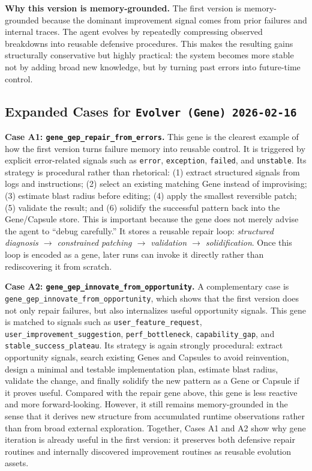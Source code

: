 \documentclass{article}
\newcommand{\nbf}[1]{{\noindent \textbf{#1}}}
\begin{document}
\nbf{Why this version is memory-grounded.}
The first version is memory-grounded because the dominant improvement signal comes from prior failures and internal traces.
The agent evolves by repeatedly compressing observed breakdowns into reusable defensive procedures.
This makes the resulting gains structurally conservative but highly practical: the system becomes more stable not by adding broad new knowledge, but by turning past errors into future-time control.

\subsection{Expanded Cases for \texttt{Evolver (Gene) 2026-02-16}}
\label{app:first_run_cases}

\nbf{Case A1: \texttt{gene\_gep\_repair\_from\_errors}.}
This gene is the clearest example of how the first version turns failure memory into reusable control.
It is triggered by explicit error-related signals such as \texttt{error}, \texttt{exception}, \texttt{failed}, and \texttt{unstable}.
Its strategy is procedural rather than rhetorical:
(1) extract structured signals from logs and instructions;
(2) select an existing matching Gene instead of improvising;
(3) estimate blast radius before editing;
(4) apply the smallest reversible patch;
(5) validate the result; and
(6) solidify the successful pattern back into the Gene/Capsule store.
This is important because the gene does not merely advise the agent to ``debug carefully.''
It stores a reusable repair loop:
\emph{structured diagnosis $\rightarrow$ constrained patching $\rightarrow$ validation $\rightarrow$ solidification}.
Once this loop is encoded as a gene, later runs can invoke it directly rather than rediscovering it from scratch.

\nbf{Case A2: \texttt{gene\_gep\_innovate\_from\_opportunity}.}
A complementary case is \texttt{gene\_gep\_innovate\_from\_opportunity}, which shows that the first version does not only repair failures, but also internalizes useful opportunity signals.
This gene is matched to signals such as \texttt{user\_feature\_request}, \texttt{user\_improvement\_suggestion}, \texttt{perf\_bottleneck}, \texttt{capability\_gap}, and \texttt{stable\_success\_plateau}.
Its strategy is again strongly procedural:
extract opportunity signals, search existing Genes and Capsules to avoid reinvention, design a minimal and testable implementation plan, estimate blast radius, validate the change, and finally solidify the new pattern as a Gene or Capsule if it proves useful.
Compared with the repair gene above, this gene is less reactive and more forward-looking.
However, it still remains memory-grounded in the sense that it derives new structure from accumulated runtime observations rather than from broad external exploration.
Together, Cases A1 and A2 show why gene iteration is already useful in the first version:
it preserves both defensive repair routines and internally discovered improvement routines as reusable evolution assets.
\end{document}
